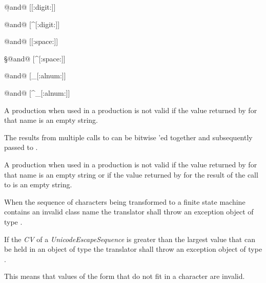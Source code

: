 \begin{codeblock}
\d @\textnormal{and}@ [[:digit:]]

\D @\textnormal{and}@ [^[:digit:]]

\s @\textnormal{and}@ [[:space:]]

\S @\textnormal{and}@ [^[:space:]]

\w @\textnormal{and}@ [_[:alnum:]]

\W @\textnormal{and}@ [^_[:alnum:]]
\end{codeblock}

\pnum
{}%
%
A  production when used in
a  production is not valid
if the value returned by  for
that name is an empty string.

\pnum
{}%
%
%
%
The results from multiple calls
to  can be bitwise 'ed
together and subsequently passed to .

\pnum
A  production when used in
a  production is not valid if the value
returned by  for that name is an
empty string or if the value returned by 
for the result of the call to 
is an empty string.

\pnum
{}%
When the sequence of characters being transformed to a finite state
machine contains an invalid class name the translator shall throw an
exception object of type .

\pnum
{}%
If the \textit{CV} of a \textit{UnicodeEscapeSequence} is greater than the largest
value that can be held in an object of type  the translator shall
throw an exception object of type .
\begin{note}
This means that values of the form  that do not fit in
a character are invalid.
\end{note}

